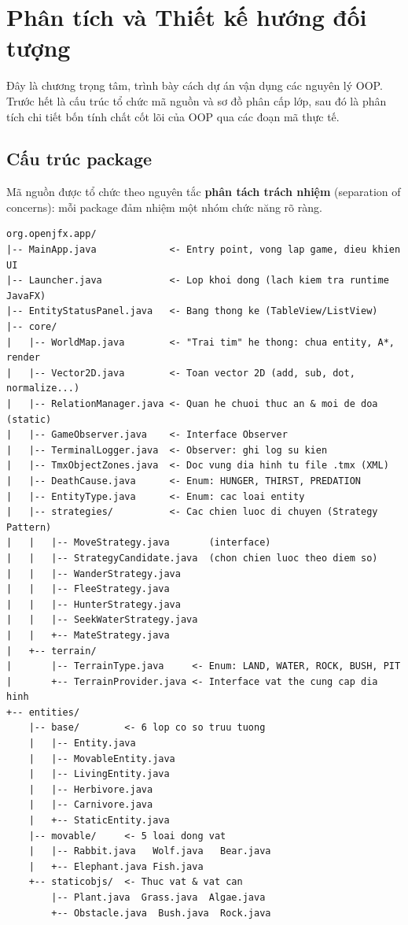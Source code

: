 \documentclass[12pt,a4paper]{report}
\newcommand{\keyword}[1]{\textcolor{primaryblue}{\textbf{#1}}}
\begin{document}
\chapter{Phân tích và Thiết kế hướng đối tượng}

Đây là chương trọng tâm, trình bày cách dự án vận dụng các nguyên lý OOP. Trước hết là cấu trúc tổ chức mã nguồn và sơ đồ phân cấp lớp, sau đó là phân tích chi tiết bốn tính chất cốt lõi của OOP qua các đoạn mã thực tế.

\section{Cấu trúc package}

Mã nguồn được tổ chức theo nguyên tắc \keyword{phân tách trách nhiệm} (separation of concerns): mỗi package đảm nhiệm một nhóm chức năng rõ ràng.

\begin{lstlisting}[style=pseudostyle, caption={Cấu trúc thư mục dự án}]
org.openjfx.app/
|-- MainApp.java             <- Entry point, vong lap game, dieu khien UI
|-- Launcher.java            <- Lop khoi dong (lach kiem tra runtime JavaFX)
|-- EntityStatusPanel.java   <- Bang thong ke (TableView/ListView)
|-- core/
|   |-- WorldMap.java        <- "Trai tim" he thong: chua entity, A*, render
|   |-- Vector2D.java        <- Toan vector 2D (add, sub, dot, normalize...)
|   |-- RelationManager.java <- Quan he chuoi thuc an & moi de doa (static)
|   |-- GameObserver.java    <- Interface Observer
|   |-- TerminalLogger.java  <- Observer: ghi log su kien
|   |-- TmxObjectZones.java  <- Doc vung dia hinh tu file .tmx (XML)
|   |-- DeathCause.java      <- Enum: HUNGER, THIRST, PREDATION
|   |-- EntityType.java      <- Enum: cac loai entity
|   |-- strategies/          <- Cac chien luoc di chuyen (Strategy Pattern)
|   |   |-- MoveStrategy.java       (interface)
|   |   |-- StrategyCandidate.java  (chon chien luoc theo diem so)
|   |   |-- WanderStrategy.java
|   |   |-- FleeStrategy.java
|   |   |-- HunterStrategy.java
|   |   |-- SeekWaterStrategy.java
|   |   +-- MateStrategy.java
|   +-- terrain/
|       |-- TerrainType.java     <- Enum: LAND, WATER, ROCK, BUSH, PIT
|       +-- TerrainProvider.java <- Interface vat the cung cap dia hinh
+-- entities/
    |-- base/        <- 6 lop co so truu tuong
    |   |-- Entity.java
    |   |-- MovableEntity.java
    |   |-- LivingEntity.java
    |   |-- Herbivore.java
    |   |-- Carnivore.java
    |   +-- StaticEntity.java
    |-- movable/     <- 5 loai dong vat
    |   |-- Rabbit.java   Wolf.java   Bear.java
    |   +-- Elephant.java Fish.java
    +-- staticobjs/  <- Thuc vat & vat can
        |-- Plant.java  Grass.java  Algae.java
        +-- Obstacle.java  Bush.java  Rock.java
\end{lstlisting}
\end{document}
